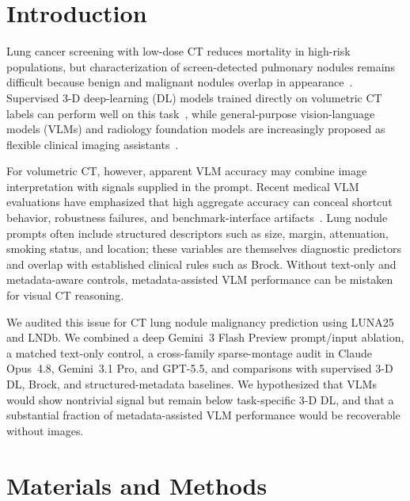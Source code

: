 \documentclass[11pt]{article}
\begin{document}
\section{Introduction}\label{sec:intro}

Lung cancer screening with low-dose CT reduces mortality in high-risk populations, but characterization of screen-detected pulmonary nodules remains difficult because benign and malignant nodules overlap in appearance~\citep{ref-nlst,ref-fleischner}. Supervised 3-D deep-learning (DL) models trained directly on volumetric CT labels can perform well on this task~\citep{ref-venkadesh}, while general-purpose vision-language models (VLMs) and radiology foundation models are increasingly proposed as flexible clinical imaging assistants~\citep{ref-lee2025review3d,ref-wu2025radfm,ref-wu2025vlfm3d}.

For volumetric CT, however, apparent VLM accuracy may combine image interpretation with signals supplied in the prompt. Recent medical VLM evaluations have emphasized that high aggregate accuracy can conceal shortcut behavior, robustness failures, and benchmark-interface artifacts~\citep{ref-jin2024hidden,ref-kurz2025benchmark,ref-cheng2025robustness}. Lung nodule prompts often include structured descriptors such as size, margin, attenuation, smoking status, and location; these variables are themselves diagnostic predictors and overlap with established clinical rules such as Brock. Without text-only and metadata-aware controls, metadata-assisted VLM performance can be mistaken for visual CT reasoning.

We audited this issue for CT lung nodule malignancy prediction using LUNA25 and LNDb. We combined a deep Gemini~3 Flash Preview prompt/input ablation, a matched text-only control, a cross-family sparse-montage audit in Claude Opus~4.8, Gemini~3.1 Pro, and GPT-5.5, and comparisons with supervised 3-D DL, Brock, and structured-metadata baselines. We hypothesized that VLMs would show nontrivial signal but remain below task-specific 3-D DL, and that a substantial fraction of metadata-assisted VLM performance would be recoverable without images.

\section{Materials and Methods}\label{sec:methods}
\end{document}
